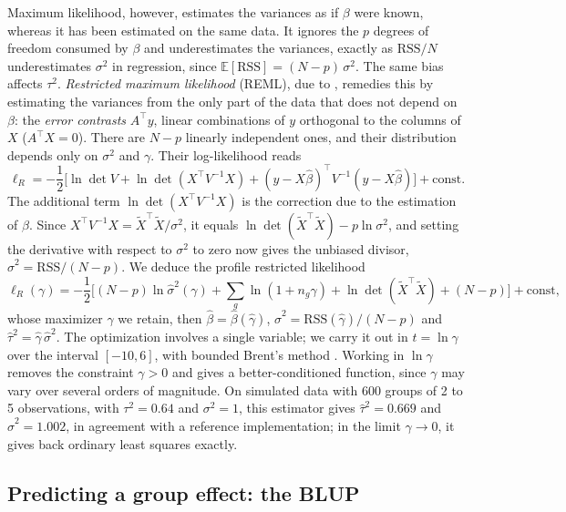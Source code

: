 \documentclass[11pt,a4paper]{article}
\newcommand{\E}{\mathbb{E}}
\begin{document}
Maximum likelihood, however, estimates the variances as if $\beta$ were known, whereas it has been estimated on the
same data. It ignores the $p$ degrees of freedom consumed by $\beta$ and underestimates the variances, exactly as
$\mathrm{RSS}/N$ underestimates $\sigma^2$ in regression, since $\E[\mathrm{RSS}] = (N - p)\,\sigma^2$. The same bias
affects $\tau^2$. \emph{Restricted maximum likelihood} (REML), due to \citet{patterson1971}, remedies this by
estimating the variances from the only part of the data that does not depend on $\beta$: the \emph{error contrasts}
$A^\top y$, linear combinations of $y$ orthogonal to the columns of $X$ ($A^\top X = 0$). There are $N - p$ linearly
independent ones, and their distribution depends only on $\sigma^2$ and $\gamma$. Their log-likelihood reads
\[
\ell_R = -\frac12\Big[\ln\det V + \ln\det(X^\top V^{-1}X) + (y - X\hat\beta)^\top V^{-1}(y - X\hat\beta)\Big]
+ \text{const}.
\]
The additional term $\ln\det(X^\top V^{-1}X)$ is the correction due to the estimation of $\beta$. Since
$X^\top V^{-1}X = \tilde X^\top\tilde X/\sigma^2$, it equals $\ln\det(\tilde X^\top\tilde X) - p\ln\sigma^2$, and
setting the derivative with respect to $\sigma^2$ to zero now gives the unbiased divisor,
$\hat\sigma^2 = \mathrm{RSS}/(N-p)$. We deduce the profile restricted likelihood
\begin{equation}\label{eq:reml}
\ell_R(\gamma) = -\frac12\Big[(N - p)\ln\hat\sigma^2(\gamma) + \sum_g\ln(1 + n_g\gamma)
+ \ln\det(\tilde X^\top\tilde X) + (N - p)\Big] + \text{const},
\end{equation}
whose maximizer $\hat\gamma$ we retain, then $\hat\beta = \hat\beta(\hat\gamma)$,
$\hat\sigma^2 = \mathrm{RSS}(\hat\gamma)/(N - p)$ and $\hat\tau^2 = \hat\gamma\,\hat\sigma^2$. The optimization
involves a single variable; we carry it out in $t = \ln\gamma$ over the interval $[-10, 6]$, with bounded Brent's
method \citep{brent1973}. Working in $\ln\gamma$ removes the constraint $\gamma > 0$ and gives a better-conditioned
function, since $\gamma$ may vary over several orders of magnitude. On simulated data with 600 groups of 2 to 5
observations, with $\tau^2 = 0.64$ and $\sigma^2 = 1$, this estimator gives $\hat\tau^2 = 0.669$ and
$\hat\sigma^2 = 1.002$, in agreement with a reference implementation; in the limit $\gamma \to 0$, it gives back
ordinary least squares exactly.

\subsection{Predicting a group effect: the BLUP}\label{sec:blup}
\end{document}
